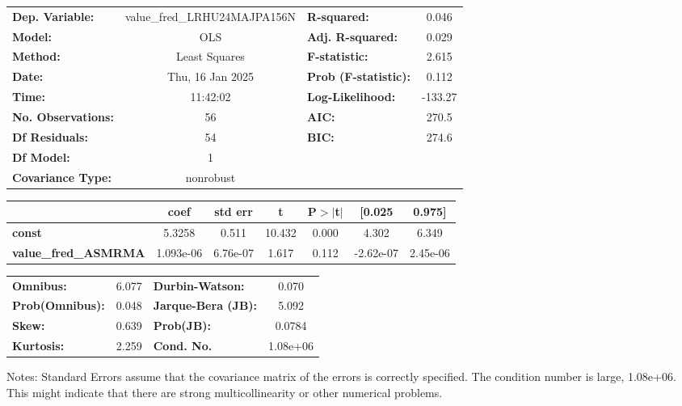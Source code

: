 \begin{center}
\begin{tabular}{lclc}
\toprule
\textbf{Dep. Variable:}      & value\_fred\_LRHU24MAJPA156N & \textbf{  R-squared:         } &     0.046   \\
\textbf{Model:}              &             OLS              & \textbf{  Adj. R-squared:    } &     0.029   \\
\textbf{Method:}             &        Least Squares         & \textbf{  F-statistic:       } &     2.615   \\
\textbf{Date:}               &       Thu, 16 Jan 2025       & \textbf{  Prob (F-statistic):} &    0.112    \\
\textbf{Time:}               &           11:42:02           & \textbf{  Log-Likelihood:    } &   -133.27   \\
\textbf{No. Observations:}   &                56            & \textbf{  AIC:               } &     270.5   \\
\textbf{Df Residuals:}       &                54            & \textbf{  BIC:               } &     274.6   \\
\textbf{Df Model:}           &                 1            & \textbf{                     } &             \\
\textbf{Covariance Type:}    &          nonrobust           & \textbf{                     } &             \\
\bottomrule
\end{tabular}
\begin{tabular}{lcccccc}
                             & \textbf{coef} & \textbf{std err} & \textbf{t} & \textbf{P$> |$t$|$} & \textbf{[0.025} & \textbf{0.975]}  \\
\midrule
\textbf{const}               &       5.3258  &        0.511     &    10.432  &         0.000        &        4.302    &        6.349     \\
\textbf{value\_fred\_ASMRMA} &    1.093e-06  &     6.76e-07     &     1.617  &         0.112        &    -2.62e-07    &     2.45e-06     \\
\bottomrule
\end{tabular}
\begin{tabular}{lclc}
\textbf{Omnibus:}       &  6.077 & \textbf{  Durbin-Watson:     } &    0.070  \\
\textbf{Prob(Omnibus):} &  0.048 & \textbf{  Jarque-Bera (JB):  } &    5.092  \\
\textbf{Skew:}          &  0.639 & \textbf{  Prob(JB):          } &   0.0784  \\
\textbf{Kurtosis:}      &  2.259 & \textbf{  Cond. No.          } & 1.08e+06  \\
\bottomrule
\end{tabular}
\end{center}

Notes: \newline
 [1] Standard Errors assume that the covariance matrix of the errors is correctly specified. \newline
 [2] The condition number is large, 1.08e+06. This might indicate that there are \newline
 strong multicollinearity or other numerical problems.